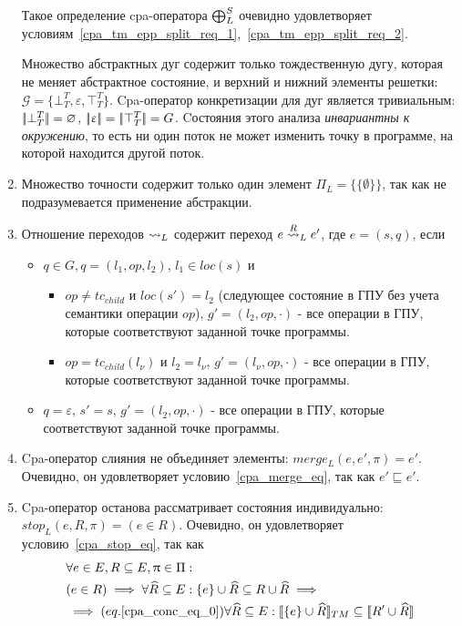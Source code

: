 \begin{enumerate}
Такое определение cpa-оператора $\mathrel{\bigoplus}^S_{L}$ очевидно удовлетворяет условиям~\ref{cpa_tm_epp_split_req_1},~\ref{cpa_tm_epp_split_req_2}.

Множество абстрактных дуг содержит только тождественную дугу, которая не меняет абстрактное состояние, и верхний и нижний элементы решетки: $\mathcal{G} = \{\bot^T_T, \varepsilon, \top^T_T\}$.
Cpa-оператор конкретизации для дуг является тривиальным: $\lvert \! \lvert \bot^T_T \rvert \! \rvert = \varnothing$, $\lvert \! \lvert \upvarepsilon \rvert \! \rvert = \lvert \! \lvert \top^T_T \rvert \! \rvert = G$.
Cостояния этого анализа {\em инвариантны к окружению}, то есть ни один поток не может изменить точку в программе, на которой находится другой поток.

\item Множество точности содержит только один элемент $\Pi_L = \{\{\emptyset\}\}$, так как не подразумевается применение абстракции.

\item Отношение переходов $\leadsto_L$ содержит переход $e \stackrel{R}{\leadsto}_L e'$, где $e = (s, q)$, если 
\begin{itemize}
\item $q \in G, q=(l_1,op,l_2)$, $l_1 \in loc(s)$ и
\begin{itemize}
\item $op \neq tc_{child}$ и $loc(s') = l_2$ (следующее состояние в ГПУ без учета семантики операции $op$), $g' = (l_2, op, \cdot)$ - все операции в ГПУ, которые соответствуют заданной точке программы.
\item $op=tc_{child}(l_\nu)$ и $l_2 = l_\nu$, $g' = (l_\nu, op, \cdot)$ - все операции в ГПУ, которые соответствуют заданной точке программы.
\end{itemize}
\item $q = \varepsilon$, $s'=s$, $g' = (l_2, op, \cdot)$ - все операции в ГПУ, которые соответствуют заданной точке программы.
\end{itemize}


\item Cpa-оператор слияния не объединяет элементы: $merge_L(e, e', \pi) = e'$. Очевидно, он удовлетворяет условию~\ref{cpa_merge_eq}, так как $e' \sqsubseteq e'$.

\item Cpa-оператор останова рассматривает состояния индивидуально: $stop_L(e, R, \pi) = (e \in R)$. Очевидно, он удовлетворяет условию~\ref{cpa_stop_eq}, так как
\begin{align}
&\forall e \in E, R \subseteq E, \uppi \in \Pi: \nonumber \\
& (e \in R) \implies \forall \widehat{R} \subseteq E: \{e\} \cup \widehat{R} \subseteq R \cup \widehat{R} \implies \nonumber \\
& \implies (eq.\ref{cpa_conc_eq_0}) \forall \widehat{R} \subseteq E: [\![ \{e\}\cup \widehat{R} ]\!]_{TM} \subseteq [\![ R' \cup \widehat{R} ]\!]
\end{align}


\end{enumerate}
